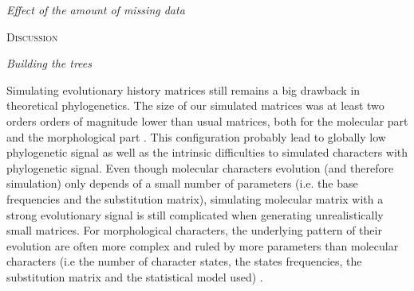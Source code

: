 \documentclass[12pt,letterpaper]{article}
\renewcommand{\section}[1]{%
\bigskip
\begin{center}
\begin{Large}
\normalfont\scshape #1
\medskip
\end{Large}
\end{center}}
\renewcommand{\subsection}[1]{%
\bigskip
\begin{center}
\begin{large}
\normalfont\itshape #1
\end{large}
\end{center}}
\begin{document}
\subsection{Effect of the amount of missing data}

%
%

\section{Discussion}


\subsection{Building the trees}
Simulating evolutionary history matrices still remains a big drawback in theoretical phylogenetics. %
The size of our simulated matrices was at least two orders orders of magnitude lower than usual matrices, both for the molecular part \citep[e.g.][]{springermacroevolutionary2012} and the morphological part \citep[e.g.][]{nithe2013}. %
This configuration probably lead to globally low phylogenetic signal as well as the intrinsic difficulties to simulated characters with phylogenetic signal.
Even though molecular characters evolution (and therefore simulation) only depends of a small number of parameters (i.e. the base frequencies and the substitution matrix), simulating molecular matrix with a strong evolutionary signal is still complicated when generating unrealistically small matrices.
For morphological characters, the underlying pattern of their evolution are often more complex and ruled by more parameters than molecular characters (i.e the number of character states, the states frequencies, the substitution matrix and the statistical model used) \citep{Pagel22011994,wagner2000,lewisa2001}.
\end{document}
